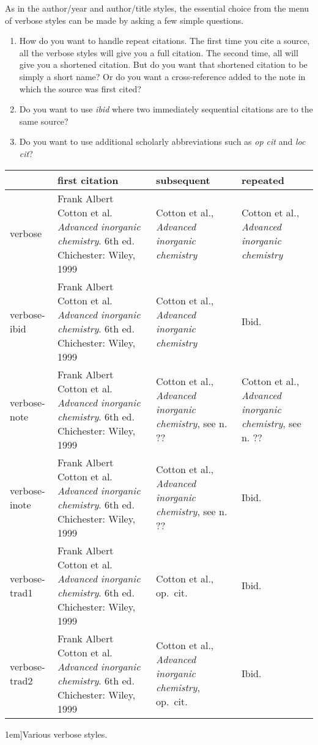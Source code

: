 As in the author/year and author/title styles, the essential choice
from the menu of verbose styles can be made by asking a few simple
questions.
\begin{enumerate}
\item How do you want to handle repeat citations. The first time you
  cite a source, all the verbose styles will give you a full
  citation. The second time, all will give you a shortened
  citation. But do you want that shortened citation to be simply a
  short name? Or do you want a cross-reference added to the note in
  which the source was first cited?
\item Do you want to use \emph{ibid} where two immediately sequential
  citations are to the same source?
\item Do you want to use additional scholarly abbreviations such as
  \emph{op cit} and \emph{loc cit}?
\end{enumerate}

\begin{table*}[btp]
\small
\begin{tabular}{lp{1.7in}p{1.7in}p{1.7in}}
\toprule
                                               & \textsf{first citation} & \textsf{subsequent} &
\textsf{repeated}                                      \\
\midrule verbose                               & Frank Albert Cotton et al. \emph{Advanced inorganic
  chemistry}. 6th ed. Chichester: Wiley, 1999  & Cotton et al.,
\emph{Advanced inorganic chemistry}            & Cotton et al., \emph{Advanced
  inorganic chemistry}                                 \\
verbose-ibid                                   & Frank Albert Cotton et al. \emph{Advanced inorganic
  chemistry}. 6th ed. Chichester: Wiley, 1999  & Cotton et al.,
\emph{Advanced inorganic chemistry}            & Ibid. \\
verbose-note                                   & Frank Albert Cotton et al. \emph{Advanced inorganic
  chemistry}. 6th ed. Chichester: Wiley, 1999  & Cotton et al.,
\emph{Advanced inorganic chemistry}, see n. ?? & Cotton et al.,
\emph{Advanced inorganic chemistry}, see n. ??         \\
verbose-inote                                  & Frank Albert Cotton et al. \emph{Advanced inorganic
  chemistry}. 6th ed. Chichester: Wiley, 1999  & Cotton et al.,
\emph{Advanced inorganic chemistry}, see n. ?? & Ibid. \\
verbose-trad1                                  & Frank Albert Cotton et al. \emph{Advanced inorganic
  chemistry}. 6th ed. Chichester: Wiley, 1999  & Cotton et al.,
op.\ cit.                                      & Ibid. \\
verbose-trad2                                  & Frank Albert Cotton et al. \emph{Advanced inorganic
  chemistry}. 6th ed. Chichester: Wiley, 1999  & Cotton et al.,
\emph{Advanced inorganic chemistry},
op.\ cit.                                      & Ibid. \\
\bottomrule
\end{tabular}
\caption[][1em]{Various verbose styles.\label{bibliography:examples:verbose}}
\end{table*}

